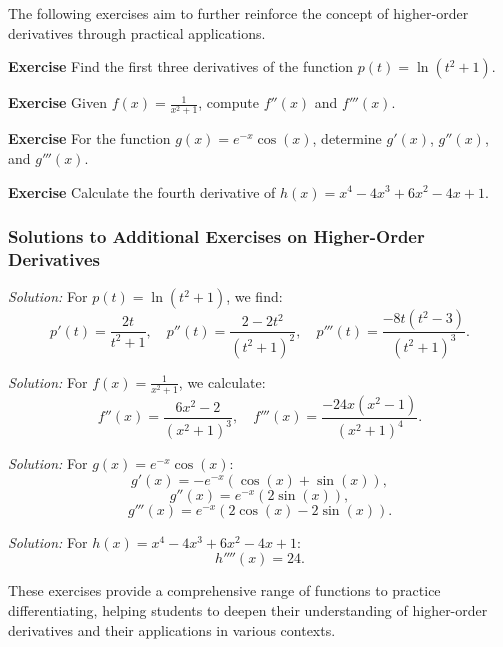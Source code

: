 \documentclass[a4paper,12pt]{book}
\newenvironment{exercise}[1][]
  {\par\medskip\noindent\textbf{Exercise #1} \rmfamily}
  {\medskip}
\newenvironment{solution}[1][]
{\par\noindent\textit{Solution:} \rmfamily}{\medskip}
\begin{document}
The following exercises aim to further reinforce the concept of higher-order derivatives through practical applications.

\begin{exercise}
Find the first three derivatives of the function \( p(t) = \ln(t^2 + 1) \).
\end{exercise}

\begin{exercise}
Given \( f(x) = \frac{1}{x^2 + 1} \), compute \( f''(x) \) and \( f'''(x) \).
\end{exercise}

\begin{exercise}
For the function \( g(x) = e^{-x} \cos(x) \), determine \( g'(x) \), \( g''(x) \), and \( g'''(x) \).
\end{exercise}

\begin{exercise}
Calculate the fourth derivative of \( h(x) = x^4 - 4x^3 + 6x^2 - 4x + 1 \).
\end{exercise}

\subsubsection*{Solutions to Additional Exercises on Higher-Order Derivatives}

\begin{solution}[to Exercise 1]
For \( p(t) = \ln(t^2 + 1) \), we find:
\[ p'(t) = \frac{2t}{t^2 + 1}, \quad p''(t) = \frac{2 - 2t^2}{(t^2 + 1)^2}, \quad p'''(t) = \frac{-8t(t^2 - 3)}{(t^2 + 1)^3}. \]
\end{solution}

\begin{solution}[to Exercise 2]
For \( f(x) = \frac{1}{x^2 + 1} \), we calculate:
\[ f''(x) = \frac{6x^2 - 2}{(x^2 + 1)^3}, \quad f'''(x) = \frac{-24x(x^2 - 1)}{(x^2 + 1)^4}. \]
\end{solution}

\begin{solution}[to Exercise 3]
For \( g(x) = e^{-x} \cos(x) \):
\[ g'(x) = -e^{-x} (\cos(x) + \sin(x)), \]
\[ g''(x) = e^{-x} (2\sin(x)), \]
\[ g'''(x) = e^{-x} (2\cos(x) - 2\sin(x)). \]
\end{solution}

\begin{solution}[to Exercise 4]
For \( h(x) = x^4 - 4x^3 + 6x^2 - 4x + 1 \):
\[ h''''(x) = 24. \]
\end{solution}

These exercises provide a comprehensive range of functions to practice differentiating, helping students to deepen their understanding of higher-order derivatives and their applications in various contexts.
\end{document}
